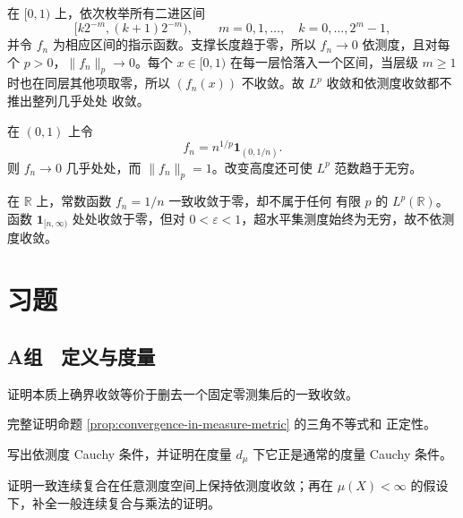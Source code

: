 \begin{example}
在 \([0,1)\) 上，依次枚举所有二进区间
\[
 [k2^{-m},(k+1)2^{-m}),\qquad
 m=0,1,\ldots,\quad k=0,\ldots,2^m-1,
\]
并令 \(f_n\) 为相应区间的指示函数。支撑长度趋于零，所以
\(f_n\to0\) 依测度，且对每个 \(p>0\)，\(\|f_n\|_p\to0\)。每个
\(x\in[0,1)\) 在每一层恰落入一个区间，当层级 \(m\ge1\) 时也在同层其他项取零，所以
\((f_n(x))\) 不收敛。故 \(L^p\) 收敛和依测度收敛都不推出整列几乎处处
收敛。
\end{example}

\begin{example}[逐点收敛但没有 \(L^p\) 收敛]
在 \((0,1)\) 上令
\[
 f_n=n^{1/p}\mathbf1_{(0,1/n)}.
\]
则 \(f_n\to0\) 几乎处处，而
\(\|f_n\|_p=1\)。改变高度还可使 \(L^p\) 范数趋于无穷。
\end{example}

\begin{example}[无限测度的影响]
在 \(\mathbb R\) 上，常数函数 \(f_n=1/n\) 一致收敛于零，却不属于任何
有限 \(p\) 的 \(L^p(\mathbb R)\)。函数
\(\mathbf1_{[n,\infty)}\) 处处收敛于零，但对
\(0<\varepsilon<1\)，超水平集测度始终为无穷，故不依测度收敛。
\end{example}

\section*{习题}
\subsection*{A组　定义与度量}
\begin{enumerate}[label=\textbf{\thechapter.\arabic*.}]
证明本质上确界收敛等价于删去一个固定零测集后的一致收敛。

完整证明命题 \ref{prop:convergence-in-measure-metric} 的三角不等式和
正定性。

写出依测度 Cauchy 条件，并证明在度量 \(d_\mu\) 下它正是通常的度量
Cauchy 条件。

证明一致连续复合在任意测度空间上保持依测度收敛；再在
\(\mu(X)<\infty\) 的假设下，补全一般连续复合与乘法的证明。

\end{enumerate}
